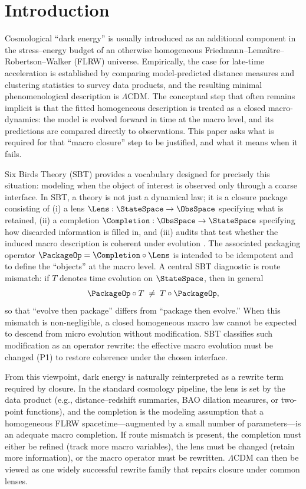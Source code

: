 \documentclass[11pt]{article}
\theoremstyle{definition}
\theoremstyle{plain}
\theoremstyle{remark}
\begin{document}
\section{Introduction}\label{sec:intro}
Cosmological ``dark energy'' is usually introduced as an additional component in the stress--energy budget of an otherwise homogeneous Friedmann--Lema\^{i}tre--Robertson--Walker (FLRW) universe. Empirically, the case for late-time acceleration is established by comparing model-predicted distance measures and clustering statistics to survey data products, and the resulting minimal phenomenological description is $\Lambda$CDM. The conceptual step that often remains implicit is that the fitted homogeneous description is treated as a closed macro-dynamics: the model is evolved forward in time at the macro level, and its predictions are compared directly to observations. This paper asks what is required for that ``macro closure'' step to be justified, and what it means when it fails.

Six Birds Theory (SBT) provides a vocabulary designed for precisely this situation: modeling when the object of interest is observed only through a coarse interface. In SBT, a theory is not just a dynamical law; it is a closure package consisting of (i) a lens $\Lens:\StateSpace\to\ObsSpace$ specifying what is retained, (ii) a completion $\Completion:\ObsSpace\to\StateSpace$ specifying how discarded information is filled in, and (iii) audits that test whether the induced macro description is coherent under evolution \cite{Tsiokos2026SixBirds,Tsiokos2026WakeStone}. The associated packaging operator $\PackageOp= \Completion\circ \Lens$ is intended to be idempotent and to define the ``objects'' at the macro level. A central SBT diagnostic is route mismatch: if $T$ denotes time evolution on $\StateSpace$, then in general
\begin{equation}
\PackageOp\circ T \;\neq\; T\circ \PackageOp,
\label{eq:route_mismatch_intro}
\end{equation}
so that ``evolve then package'' differs from ``package then evolve.'' When this mismatch is non-negligible, a closed homogeneous macro law cannot be expected to descend from micro evolution without modification. SBT classifies such modification as an operator rewrite: the effective macro evolution must be changed (P1) to restore coherence under the chosen interface.

From this viewpoint, dark energy is naturally reinterpreted as a rewrite term required by closure. In the standard cosmology pipeline, the lens is set by the data product (e.g., distance--redshift summaries, BAO dilation measures, or two-point functions), and the completion is the modeling assumption that a homogeneous FLRW spacetime---augmented by a small number of parameters---is an adequate macro completion. If route mismatch is present, the completion must either be refined (track more macro variables), the lens must be changed (retain more information), or the macro operator must be rewritten. $\Lambda$CDM can then be viewed as one widely successful rewrite family that repairs closure under common lenses.
\end{document}

